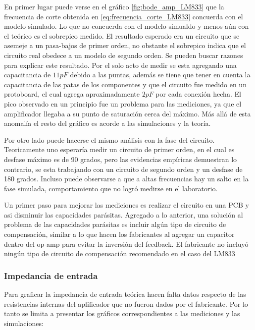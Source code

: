 

En primer lugar puede verse en el gráfico \ref{fig:bode_amp_LM833} que la frecuencia de corte obtenida en \ref{eq:frecuencia_corte_LM833} concuerda con el modelo simulado. Lo que no concuerda con el modelo simualdo y menos aún con el teórico es el sobrepico medido. El resultado esperado era un circuito que se asemeje a un pasa-bajos de primer orden, no obstante el sobrepico indica que el circuito real obedece a un modelo de segundo orden. Se pueden buscar razones para explicar este resultado. Por el solo acto de medir se esta agregando una capacitancia de $11pF$ debido a las puntas, además se tiene que tener en cuenta la capacitancia de las patas de los componentes y que el circuito fue medido en un protoboard, el cual agrega aproximadamente $2pF$ por cada conexión hecha. El pico observado en un principio fue un problema para las mediciones, ya que el amplificador llegaba a su punto de saturación cerca del máximo. Más allá de esta anomalía el resto del gráfico es acorde a las simulaciones y la teoría. 

Por otro lado puede hacerse el mismo análisis con la fase del circuito. Teoricamente uno esperaría medir un circuito de primer orden, en el cual es desfase máximo es de 90 grados, pero las evidencias empíricas demuestran lo contrario, se esta trabajando con un circuito de segundo orden y un desfase de 180 grados. Incluso puede observarse a que a altas frecuencias hay un salto en la fase simulada, comportamiento que no logró medirse en el laboratorio.

Un primer paso para mejorar las mediciones es realizar el circuito en una PCB y asi disminuir las capacidades parásitas. Agregado a lo anterior, una solución al problema de las capacidades parásitas es incluir algún tipo de circuito de compensación, similar a lo que hacen los fabricantes al agregar un capacitor dentro del op-amp para evitar la inversión del feedback. El fabricante no incluyó ningún tipo de circuito de compensación recomendado en el caso del LM833 

\subsubsection{Impedancia de entrada}

Para graficar la impedancia de entrada teórica hacen falta datos respecto de las resistencias internas del aplificador que no fueron dados por el fabricante. Por lo tanto se limita a presentar los gráficos correspondientes a las mediciones y las simulaciones:

